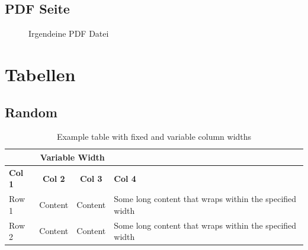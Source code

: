 \documentclass{scrartcl}
\begin{document}
    \FloatBarrier
    \noindent

\newpage
\subsection{PDF Seite}
\begin{figure}[ht]
    
    \caption{Irgendeine PDF Datei}
    \label{fig:Tangrami}
\end{figure}
\FloatBarrier
\noindent
\newpage

\section{Tabellen}
\subsection{Random}
\noindent
\FloatBarrier
\begin{table}[htbp]
    \centering
    \caption{Example table with fixed and variable column widths}
    \begin{tabular}{|>{\centering\arraybackslash}p{2cm}|c|c|p{3cm}|}
        \hline
        \multicolumn{2}{|c|}{\textbf{Fixed Width}} & \multicolumn{2}{c|}{\textbf{Variable Width}} \\
        \hline
        \textbf{Col 1} & \textbf{Col 2} & \textbf{Col 3} & \textbf{Col 4} \\
        \hline
        Row 1 & Content & Content & Some long content that wraps within the specified width \\
        \hline
        Row 2 & Content & Content & Some long content that wraps within the specified width \\
        \hline
    \end{tabular}
    \label{tab:example}
\end{table}
\FloatBarrier
\end{document}
